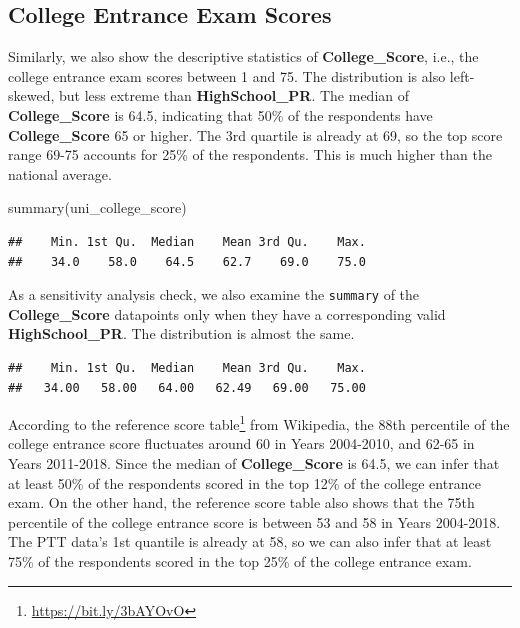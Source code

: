 \documentclass[
]{article}
\newenvironment{Shaded}{\begin{snugshade}}{\end{snugshade}}
\newcommand{\FunctionTok}[1]{\textcolor[rgb]{0.00,0.00,0.00}{#1}}
\newcommand{\NormalTok}[1]{#1}
\newcommand{\SpecialCharTok}[1]{\textcolor[rgb]{0.00,0.00,0.00}{#1}}
\begin{document}
\hypertarget{college-entrance-exam-scores}{%
\subsection{College Entrance Exam
Scores}\label{college-entrance-exam-scores}}

Similarly, we also show the descriptive statistics of
\textbf{College\_Score}, i.e., the college entrance exam scores between
1 and 75. The distribution is also left-skewed, but less extreme than
\textbf{HighSchool\_PR}. The median of \textbf{College\_Score} is 64.5,
indicating that 50\% of the respondents have \textbf{College\_Score} 65
or higher. The 3rd quartile is already at 69, so the top score range
69-75 accounts for 25\% of the respondents. This is much higher than the
national average.

\begin{Shaded}
\begin{Highlighting}[]
\FunctionTok{summary}\NormalTok{(uni\_college\_score)}
\end{Highlighting}
\end{Shaded}

\begin{verbatim}
##    Min. 1st Qu.  Median    Mean 3rd Qu.    Max. 
##    34.0    58.0    64.5    62.7    69.0    75.0
\end{verbatim}

As a sensitivity analysis check, we also examine the \texttt{summary} of
the \textbf{College\_Score} datapoints only when they have a
corresponding valid \textbf{HighSchool\_PR}. The distribution is almost
the same.

\begin{Shaded}
\end{Shaded}

\begin{verbatim}
##    Min. 1st Qu.  Median    Mean 3rd Qu.    Max. 
##   34.00   58.00   64.00   62.49   69.00   75.00
\end{verbatim}

According to the reference score table\footnote{\url{https://bit.ly/3bAYOvO}}
from Wikipedia, the 88th percentile of the college entrance score
fluctuates around 60 in Years 2004-2010, and 62-65 in Years 2011-2018.
Since the median of \textbf{College\_Score} is 64.5, we can infer that
at least 50\% of the respondents scored in the top 12\% of the college
entrance exam. On the other hand, the reference score table also shows
that the 75th percentile of the college entrance score is between 53 and
58 in Years 2004-2018. The PTT data's 1st quantile is already at 58, so
we can also infer that at least 75\% of the respondents scored in the
top 25\% of the college entrance exam.
\end{document}
